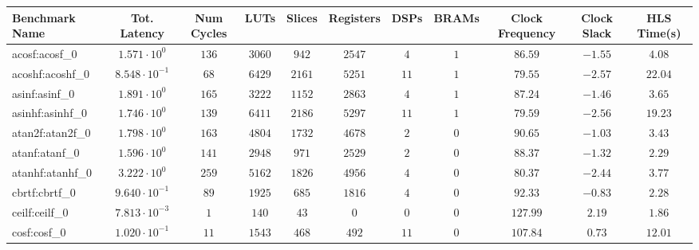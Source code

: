 \begin{tabular}{|l|c|c|c|c|c|c|c|c|c|c|}
\hline
Benchmark Name               & Tot. Latency            & Num Cycles & LUTs       & Slices    & Registers & DSPs    & BRAMs & Clock Frequency & Clock Slack & HLS Time(s) \\
\hline
acosf:acosf\_0               & $ 1.571 \cdot 10^{0}  $ & $ 136    $ & $ 3060   $ & $ 942   $ & $ 2547  $ & $ 4   $ & $ 1 $ & $ 86.59       $ & $ -1.55   $ & $ 4.08    $ \\
acoshf:acoshf\_0             & $ 8.548 \cdot 10^{-1} $ & $ 68     $ & $ 6429   $ & $ 2161  $ & $ 5251  $ & $ 11  $ & $ 1 $ & $ 79.55       $ & $ -2.57   $ & $ 22.04   $ \\
asinf:asinf\_0               & $ 1.891 \cdot 10^{0}  $ & $ 165    $ & $ 3222   $ & $ 1152  $ & $ 2863  $ & $ 4   $ & $ 1 $ & $ 87.24       $ & $ -1.46   $ & $ 3.65    $ \\
asinhf:asinhf\_0             & $ 1.746 \cdot 10^{0}  $ & $ 139    $ & $ 6411   $ & $ 2186  $ & $ 5297  $ & $ 11  $ & $ 1 $ & $ 79.59       $ & $ -2.56   $ & $ 19.23   $ \\
atan2f:atan2f\_0             & $ 1.798 \cdot 10^{0}  $ & $ 163    $ & $ 4804   $ & $ 1732  $ & $ 4678  $ & $ 2   $ & $ 0 $ & $ 90.65       $ & $ -1.03   $ & $ 3.43    $ \\
atanf:atanf\_0               & $ 1.596 \cdot 10^{0}  $ & $ 141    $ & $ 2948   $ & $ 971   $ & $ 2529  $ & $ 2   $ & $ 0 $ & $ 88.37       $ & $ -1.32   $ & $ 2.29    $ \\
atanhf:atanhf\_0             & $ 3.222 \cdot 10^{0}  $ & $ 259    $ & $ 5162   $ & $ 1826  $ & $ 4956  $ & $ 4   $ & $ 0 $ & $ 80.37       $ & $ -2.44   $ & $ 3.77    $ \\
cbrtf:cbrtf\_0               & $ 9.640 \cdot 10^{-1} $ & $ 89     $ & $ 1925   $ & $ 685   $ & $ 1816  $ & $ 4   $ & $ 0 $ & $ 92.33       $ & $ -0.83   $ & $ 2.28    $ \\
ceilf:ceilf\_0               & $ 7.813 \cdot 10^{-3} $ & $ 1      $ & $ 140    $ & $ 43    $ & $ 0     $ & $ 0   $ & $ 0 $ & $ 127.99      $ & $ 2.19    $ & $ 1.86    $ \\
cosf:cosf\_0                 & $ 1.020 \cdot 10^{-1} $ & $ 11     $ & $ 1543   $ & $ 468   $ & $ 492   $ & $ 11  $ & $ 0 $ & $ 107.84      $ & $ 0.73    $ & $ 12.01   $ \\

\end{tabular}

